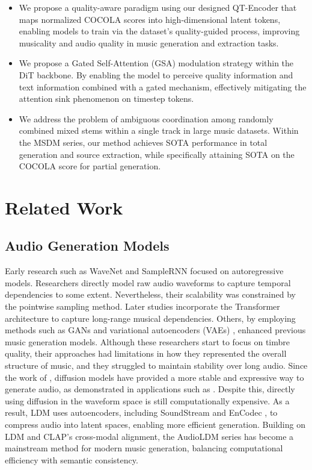 \documentclass[lettersize,journal]{IEEEtran}
\begin{document}
\begin{itemize}
    \item We propose a quality-aware paradigm using our designed QT-Encoder that maps normalized COCOLA scores into high-dimensional latent tokens, enabling models to train via the dataset's quality-guided process, improving musicality and audio quality in music generation and extraction tasks.
    
    \item We propose a Gated Self-Attention (GSA) modulation strategy within the DiT backbone. By enabling the model to perceive quality information and text information combined with a gated mechanism, effectively mitigating the attention sink phenomenon on timestep tokens.
    
    \item We address the problem of ambiguous coordination among randomly combined mixed stems within a single track in large music datasets. Within the MSDM series, our method achieves SOTA performance in total generation and source extraction, while specifically attaining SOTA on the COCOLA score for partial generation.

\end{itemize}

\section{Related Work}
\subsection{Audio Generation Models }
Early research such as WaveNet \cite{Oord_2016} and SampleRNN \cite{Mehri_2016} focused on autoregressive models. Researchers directly model raw audio waveforms to capture temporal dependencies to some extent. Nevertheless, their scalability was constrained by the pointwise sampling method. Later studies \cite{Huang_2018,Dhariwal_2020} incorporate the Transformer architecture \cite{vaswani2017attention} to capture long-range musical dependencies. Others, by employing methods such as GANs and variational autoencoders (VAEs) \cite{kumar2019melgan,kong2020hifi}, enhanced previous music generation models. Although these researchers start to focus on timbre quality, their approaches had limitations in how they represented the overall structure of music, and they struggled to maintain stability over long audio. Since the work of \cite{Nichol_2021}, diffusion models have provided a more stable and expressive way to generate audio, as demonstrated in applications such as \cite{kong2020diffwave}. Despite this, directly using diffusion in the waveform space is still computationally expensive. As a result, LDM \cite{Rombach_2021} uses autoencoders, including SoundStream \cite{zeghidour2021soundstream} and EnCodec \cite{defossez2022high}, to compress audio into latent spaces, enabling more efficient generation. Building on LDM and CLAP's cross-modal alignment, the AudioLDM \cite{Liu_2023} series has become a mainstream method for modern music generation, balancing computational efficiency with semantic consistency.
\end{document}
